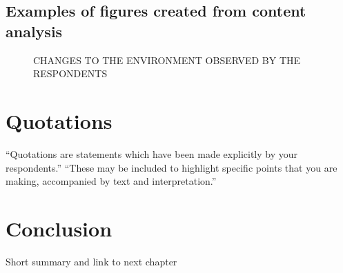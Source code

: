 \subsection{Examples of figures created from content analysis}
 
 \begin{figure}[!htb]
        \caption{\label{fig:environment} CHANGES TO THE ENVIRONMENT OBSERVED BY THE RESPONDENTS}
\end{figure}    


\section{Quotations}

“Quotations are statements which have been made explicitly by your respondents.”
“These may be included to highlight specific points that you are making, accompanied by text and interpretation.”

\section{Conclusion}
\label{sec:conclucionchapter4}
Short summary and link to next chapter


